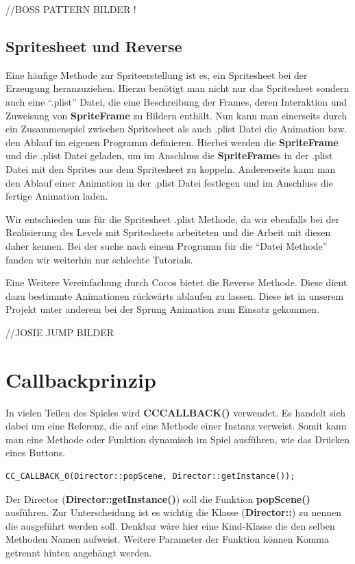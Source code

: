 //BOSS PATTERN BILDER !


\subsection{Spritesheet und Reverse}

Eine häufige Methode zur Spriteerstellung ist es, ein Spritesheet bei der Erzeugung heranzuziehen. 
Hierzu benötigt man nicht nur das Spritesheet sondern auch eine “.plist” Datei, die eine Beschreibung der Frames, deren Interaktion und Zuweisung von \textbf{SpriteFrame} zu Bildern enthält. Nun kann man einerseits durch ein Zusammenspiel zwischen Spritesheet als auch .plist Datei die Animation bzw. den Ablauf im eigenen Programm definieren. Hierbei werden die \textbf{SpriteFrame} und die .plist Datei geladen, um im Anschluss die \textbf{SpriteFrame}s in der .plist Datei mit den Sprites aus dem Spritesheet zu koppeln. Andererseits kann man den Ablauf einer Animation in der .plist Datei festlegen und im Anschluss die fertige Animation laden. 

Wir entschieden uns für die Spritesheet .plist Methode, da wir ebenfalls bei der Realisierung des Levels mit Spritesheets arbeiteten und die Arbeit mit diesen daher kennen. Bei der suche nach einem Programm für die “Datei Methode” fanden wir weiterhin nur schlechte Tutorials. 

Eine Weitere Vereinfachung durch Cocos bietet die Reverse Methode. Diese dient dazu bestimmte Animationen rückwärts ablaufen zu lassen. Diese ist in unserem Projekt unter anderem bei der Sprung Animation zum Einsatz gekommen. 

//JOSIE JUMP BILDER

\section{Callbackprinzip}

In vielen Teilen des Spieles wird \textbf{CC\textunderscore CALLBACK()} verwendet. Es handelt sich dabei um eine Referenz, die auf eine Methode einer Instanz verweist. Somit kann man eine Methode oder Funktion dynamisch im Spiel ausführen, wie das Drücken eines Buttons.

\begin{lstlisting}[style=singleline]
CC_CALLBACK_0(Director::popScene, Director::getInstance());
\end{lstlisting}

Der Director (\textbf{Director::getInstance()}) soll die Funktion \textbf{popScene()} ausführen. Zur Unterscheidung ist es wichtig die Klasse (\textbf{Director::}) zu nennen die ausgeführt werden soll. Denkbar wäre hier eine Kind-Klasse die den selben Methoden Namen aufweist. 
Weitere Parameter der Funktion können Komma getrennt hinten angehängt werden.

